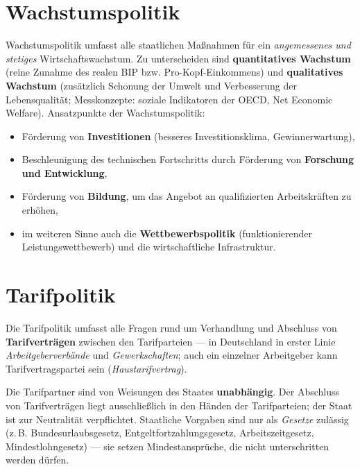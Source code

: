 \documentclass[11pt, a4paper]{article}
\begin{document}
\section{Wachstumspolitik}

Wachstumspolitik umfasst alle staatlichen Maßnahmen für ein \emph{angemessenes und
stetiges} Wirtschaftswachstum. Zu unterscheiden sind \textbf{quantitatives Wachstum}
(reine Zunahme des realen BIP bzw. Pro-Kopf-Einkommens) und \textbf{qualitatives Wachstum}
(zusätzlich Schonung der Umwelt und Verbesserung der Lebensqualität; Messkonzepte: soziale
Indikatoren der OECD, Net Economic Welfare). Ansatzpunkte der Wachstumspolitik:

\begin{itemize}
  \item Förderung von \textbf{Investitionen} (besseres Investitionsklima, Gewinnerwartung),
  \item Beschleunigung des technischen Fortschritts durch Förderung von
    \textbf{Forschung und Entwicklung},
  \item Förderung von \textbf{Bildung}, um das Angebot an qualifizierten Arbeitskräften zu
    erhöhen,
  \item im weiteren Sinne auch die \textbf{Wettbewerbspolitik} (funktionierender
    Leistungswettbewerb) und die wirtschaftliche Infrastruktur.
\end{itemize}

\section{Tarifpolitik}

Die Tarifpolitik umfasst alle Fragen rund um Verhandlung und Abschluss von
\textbf{Tarifverträgen} zwischen den Tarifparteien --- in Deutschland in erster Linie
\emph{Arbeitgeberverbände} und \emph{Gewerkschaften}; auch ein einzelner Arbeitgeber kann
Tarifvertragspartei sein (\emph{Haustarifvertrag}).

\begin{merksatz}[title={\bfseries Tarifautonomie (Art. 9 Abs. 3 GG)}]
Die Tarifpartner sind von Weisungen des Staates \textbf{unabhängig}. Der Abschluss von
Tarifverträgen liegt ausschließlich in den Händen der Tarifparteien; der Staat ist zur
Neutralität verpflichtet. Staatliche Vorgaben sind nur als \emph{Gesetze} zulässig
(z.\,B. Bundesurlaubsgesetz, Entgeltfortzahlungsgesetz, Arbeitszeitgesetz,
Mindestlohngesetz) --- sie setzen Mindestansprüche, die nicht unterschritten werden dürfen.
\end{merksatz}
\end{document}
